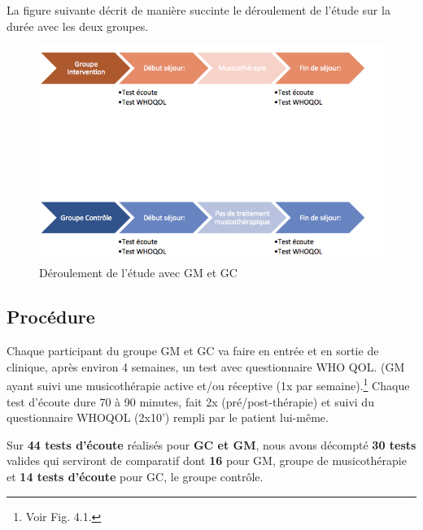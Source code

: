 La figure suivante décrit de manière succinte le déroulement de
l'étude sur la durée avec les deux groupes.



        \begin{figure}[hb]
\centering
\includegraphics[width=1\linewidth]{images/Groupecontrole.png}
\caption[Schéma du déroulement]{Déroulement de l'étude avec GM et GC}

\end{figure}

 \subsection{Procédure}
Chaque participant du groupe GM et GC va faire en entrée et en sortie de
clinique, après environ 4 semaines, un
          test avec questionnaire  WHO QOL. (GM ayant suivi une musicothérapie active et/ou réceptive (1x par
        semaine).\footnote{Voir Fig. 4.1.}
          Chaque test d'écoute dure
        70 à 90 minutes, fait 2x (pré/post-thérapie) et
        suivi du questionnaire WHOQOL (2x10') rempli par le
        patient lui-même.

Sur \textbf{44 tests d'écoute} réalisés pour \textbf{GC et GM},
      nous avons décompté\textbf{ 30 tests} valides qui serviront de
     comparatif dont \textbf{16} pour
     GM, groupe de musicothérapie et \textbf{14 tests d'écoute} pour GC, le groupe
     contrôle.

